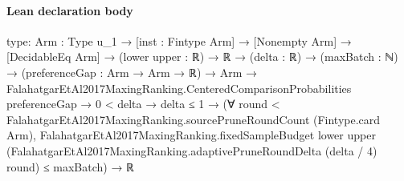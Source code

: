 \documentclass[10pt]{article}
\begin{document}
\paragraph{Lean declaration body}
\begin{ReviewVerbatim}
type:
{Arm : Type u_1} →
  [inst : Fintype Arm] →
    [Nonempty Arm] →
      [DecidableEq Arm] →
        (lower upper : ℝ) →
          ℝ →
            (delta : ℝ) →
              (maxBatch : ℕ) →
                (preferenceGap : Arm → Arm → ℝ) →
                  Arm →
                    FalahatgarEtAl2017MaxingRanking.CenteredComparisonProbabilities preferenceGap →
                      0 < delta →
                        delta ≤ 1 →
                          (∀ round < FalahatgarEtAl2017MaxingRanking.sourcePruneRoundCount (Fintype.card Arm),
                              FalahatgarEtAl2017MaxingRanking.fixedSampleBudget lower upper
                                  (FalahatgarEtAl2017MaxingRanking.adaptivePruneRoundDelta (delta / 4) round) ≤
                                maxBatch) →
                            ℝ


\end{ReviewVerbatim}
\end{document}
